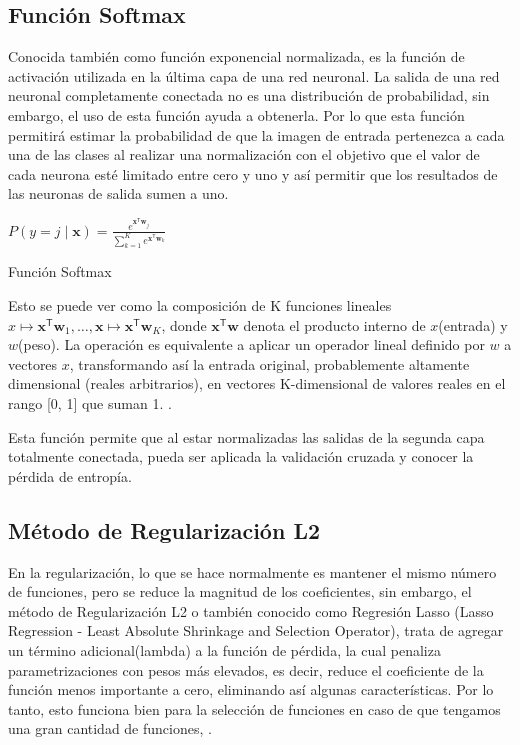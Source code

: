 	\subsection{Función Softmax}
		Conocida también como función exponencial normalizada, es la función de activación utilizada en la última capa de una red neuronal. La salida de una red neuronal completamente conectada no es una distribución de probabilidad, sin embargo, el uso de esta función ayuda a obtenerla. Por lo que esta función permitirá estimar la probabilidad de que la imagen de entrada pertenezca a cada una de las clases al realizar una normalización con el objetivo que el valor de cada neurona esté limitado entre cero y uno y así permitir que los resultados de las neuronas de salida sumen a uno. 

			\begingroup\makeatletter{}\check@mathfonts
			\begin{center}
			${\displaystyle P(y=j\mid \mathbf {x} )={\frac {e^{\mathbf {x} ^{\mathsf {T}}\mathbf {w} _{j}}}{\sum _{k=1}^{K}e^{\mathbf {x} ^{\mathsf {T}}\mathbf {w} _{k}}}}}$
			\end{center}
			\begin{center}
			{\small{Función Softmax}}
			\end{center}
			\endgroup
			
		Esto se puede ver como la composición de K funciones lineales ${x} \mapsto \mathbf {x} ^{\mathsf {T}}\mathbf {w} _{1},\ldots ,\mathbf {x} \mapsto \mathbf {x} ^{\mathsf {T}}\mathbf {w} _{K}$, donde ${\mathbf {x} ^{\mathsf {T}}\mathbf {w}}$ denota el producto interno de $x$(entrada) y $w$(peso).	La operación es equivalente a aplicar un operador lineal definido por $ w $ a vectores $ x $, transformando así la entrada original, probablemente altamente dimensional (reales arbitrarios), en vectores K-dimensional de valores reales en el rango [0, 1] que suman 1. \citep{Bishop}. 

		Esta función permite que al estar normalizadas las salidas de la segunda capa totalmente conectada, pueda ser aplicada la validación cruzada y conocer la pérdida de entropía.

	
	\subsection{Método de Regularización L2}
		En la regularización, lo que se hace normalmente es mantener el mismo número de funciones, pero se reduce la magnitud de los coeficientes, sin embargo, el método de Regularización L2 o también conocido como Regresión Lasso (Lasso Regression - Least Absolute Shrinkage and Selection Operator), trata de agregar un término adicional(lambda) a la función de pérdida, la cual penaliza parametrizaciones con pesos más elevados, es decir, reduce el coeficiente de la función menos importante a cero, eliminando así algunas características. Por lo tanto, esto funciona bien para la selección de funciones en caso de que tengamos una gran cantidad de funciones, \citep{AulaMLP}.


